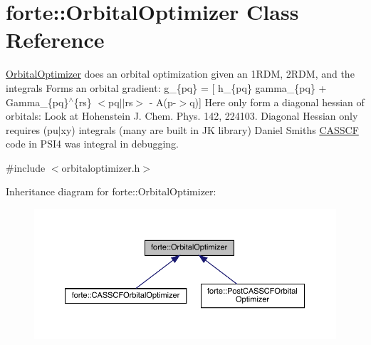 \hypertarget{classforte_1_1_orbital_optimizer}{}\section{forte\+:\+:Orbital\+Optimizer Class Reference}
\label{classforte_1_1_orbital_optimizer}


\mbox{\hyperlink{classforte_1_1_orbital_optimizer}{Orbital\+Optimizer}} does an orbital optimization given an 1\+R\+DM, 2\+R\+DM, and the integrals Forms an orbital gradient\+: g\+\_\+\{pq\} = \mbox{[} h\+\_\+\{pq\} gamma\+\_\+\{pq\} + Gamma\+\_\+\{pq\}$^\wedge$\{rs\} $<$pq$\vert$$\vert$rs$>$ -\/ A(p-\/$>$q)\mbox{]} Here only form a diagonal hessian of orbitals\+: Look at Hohenstein J. Chem. Phys. 142, 224103. Diagonal Hessian only requires (pu$\vert$xy) integrals (many are built in JK library) Daniel Smith\textquotesingle{}s \mbox{\hyperlink{classforte_1_1_c_a_s_s_c_f}{C\+A\+S\+S\+CF}} code in P\+S\+I4 was integral in debugging.  




{\ttfamily \#include $<$orbitaloptimizer.\+h$>$}



Inheritance diagram for forte\+:\+:Orbital\+Optimizer\+:
\nopagebreak
\begin{figure}[H]
\begin{center}
\leavevmode
\includegraphics[width=350pt]{classforte_1_1_orbital_optimizer__inherit__graph}
\end{center}
\end{figure}
